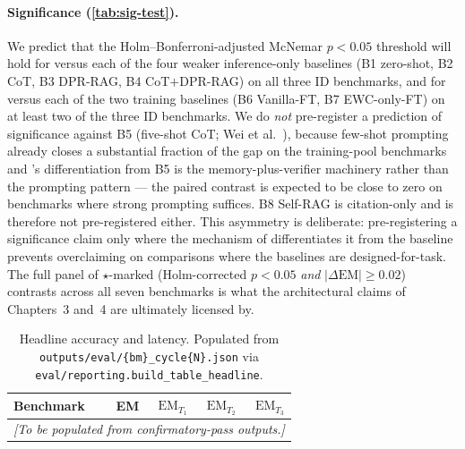 \paragraph{Significance (\cref{tab:sig-test}).}
We predict that the Holm--Bonferroni-adjusted McNemar $p < 0.05$ threshold will hold for \caem{} versus each of the four weaker inference-only baselines (B1 zero-shot, B2 CoT, B3 DPR-RAG, B4 CoT$+$DPR-RAG) on all three ID benchmarks, and for \caem{} versus each of the two training baselines (B6 Vanilla-FT, B7 EWC-only-FT) on at least two of the three ID benchmarks. We do \emph{not} pre-register a prediction of significance against B5 (five-shot CoT; Wei et al.~\cite{wei2022chain}), because few-shot prompting already closes a substantial fraction of the gap on the training-pool benchmarks and \caem{}'s differentiation from B5 is the memory-plus-verifier machinery rather than the prompting pattern --- the paired contrast is expected to be close to zero on benchmarks where strong prompting suffices. B8 Self-RAG is citation-only and is therefore not pre-registered either. This asymmetry is deliberate: pre-registering a significance claim only where the mechanism of \caem{} differentiates it from the baseline prevents overclaiming on comparisons where the baselines are designed-for-task. The full panel of $\star$-marked (Holm-corrected $p < 0.05$ \emph{and} $|\Delta\mathrm{EM}| \geq 0.02$) contrasts across all seven benchmarks is what the architectural claims of Chapters~3 and~4 are ultimately licensed by.

\begin{table}[t]
\centering
\caption{Headline accuracy and latency. Populated from
\texttt{outputs/eval/\{bm\}\_cycle\{N\}.json} via
\texttt{eval/reporting.build\_table\_headline}.}
\label{tab:headline}
\begin{tabular}{lrrrr}
\toprule
Benchmark & EM & $\mathrm{EM}_{T_1}$ & $\mathrm{EM}_{T_2}$ & $\mathrm{EM}_{T_3}$ \\
\midrule
\multicolumn{5}{c}{\emph{[To be populated from confirmatory-pass outputs.]}}\\
\bottomrule
\end{tabular}
\end{table}

